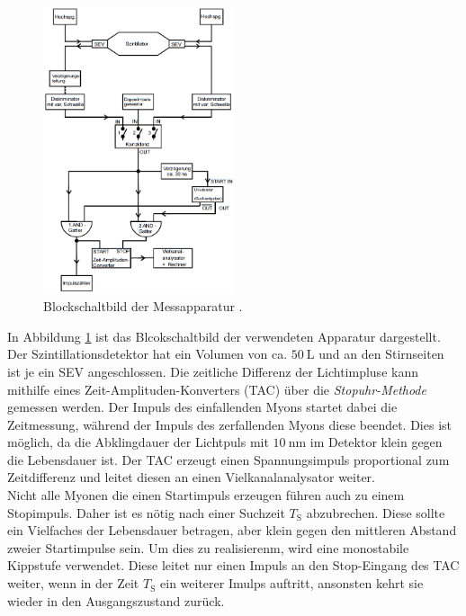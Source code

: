 \begin{figure}
	\centering
	\includegraphics[width = 0.5\textwidth]{pic/schaltung.png}
	\caption{Blockschaltbild der Messapparatur \cite{anleitung}.}
	\label{schaltung}
\end{figure}

In Abbildung \ref{schaltung} ist das Blcokschaltbild der verwendeten Apparatur dargestellt.
Der Szintillationsdetektor hat ein Volumen von ca. $\SI{50}{\liter}$ und an den Stirnseiten ist je ein SEV angeschlossen.
Die zeitliche Differenz der Lichtimpluse kann mithilfe eines Zeit-Amplituden-Konverters (TAC) über die \textit{Stopuhr-Methode} gemessen werden.
Der Impuls des einfallenden Myons startet dabei die Zeitmessung, während der Impuls des zerfallenden Myons diese beendet.
Dies ist möglich, da die Abklingdauer der Lichtpuls mit $\SI{10}{\nano\meter}$ im Detektor klein gegen die Lebensdauer ist.
Der TAC erzeugt einen Spannungsimpuls proportional zum Zeitdifferenz und leitet diesen an einen Vielkanalanalysator weiter.\\

Nicht alle Myonen die einen Startimpuls erzeugen führen auch zu einem Stopimpuls.
Daher ist es nötig nach einer Suchzeit $T_\text{S}$ abzubrechen.
Diese sollte ein Vielfaches der Lebensdauer betragen, aber klein gegen den mittleren Abstand zweier Startimpulse sein.
Um dies zu realisierenm, wird eine monostabile Kippstufe verwendet. 
Diese leitet nur einen Impuls an den Stop-Eingang des TAC weiter, wenn in der Zeit $T_\text{S}$ ein weiterer Imulps auftritt, ansonsten kehrt sie wieder in den Ausgangszustand zurück.

